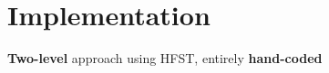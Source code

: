 \documentclass[a0paper,fleqn]{betterposter}
\newcommand{\bigtext}[1]{{\fontsize{52pt}{56pt}\selectfont #1}}
\begin{document}
{%
\vfill




}{

\section{Implementation}
\textbf{Two-level} approach using HFST, entirely \textbf{hand-coded}\\


}
\end{document}
